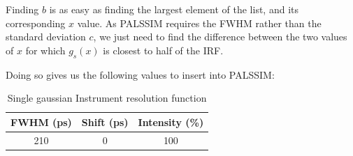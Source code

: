 Finding $b$ is as easy as finding the largest element of the list, and its corresponding $x$ value. As PALSSIM requires the FWHM rather than the standard deviation $c$, we just need to find the difference between the two values of $x$ for which $g_s(x)$ is closest to half of the IRF.

Doing so gives us the following values to insert into PALSSIM:

\begin{table}[h]
    \centering
    \begin{tabular}{|c|c|c|}
        \hline
        FWHM (ps) &  Shift (ps) & Intensity (\%) \\
        \hline
        210 & 0 & 100\\ 
        \hline
    \end{tabular}
    \caption{Single gaussian Instrument resolution function}
    \label{tab:irf-single}
\end{table}
